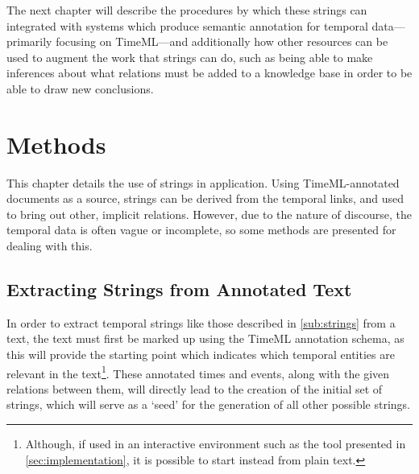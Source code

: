 \documentclass[a4paper,12pt,leqno]{article}
\begin{document}
The next chapter will describe the procedures by which these strings can integrated with systems which produce semantic annotation for temporal data---primarily focusing on TimeML---and additionally how other resources can be used to augment the work that strings can do, such as being able to make inferences about what relations must be added to a knowledge base in order to be able to draw new conclusions.

\newpage
\section{Methods}\label{sec:methods}
This chapter details the use of strings in application. Using TimeML-annotated documents as a source, strings can be derived from the temporal links, and used to bring out other, implicit relations. However, due to the nature of discourse, the temporal data is often vague or incomplete, so some methods are presented for dealing with this.

\subsection{Extracting Strings from Annotated Text}\label{sub:extracting}
In order to extract temporal strings like those described in \cref{sub:strings} from a text, the text must first be marked up using the TimeML \citep{timeml2005timeml} annotation schema, as this will provide the starting point which indicates which temporal entities are relevant in the text\footnote{Although, if used in an interactive environment such as the tool presented in \cref{sec:implementation}, it is possible to start instead from plain text.}. These annotated times and events, along with the given relations between them, will directly lead to the creation of the initial set of strings, which will serve as a `seed' for the generation of all other possible strings.
\end{document}
